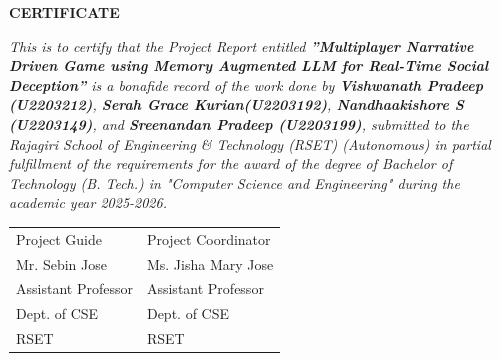 	\newpage
	\thispagestyle{empty}
	\vspace{1cm}
	\begin{center}
	
		\large \bfseries{\huge{CERTIFICATE}}\\[1cm]
	\end{center}
	
	\renewcommand{\baselinestretch}{1.2}\normalsize
	
	\emph{This is to certify that the Project Report entitled \textbf{”Multiplayer Narrative Driven Game using Memory
Augmented LLM for Real-Time Social Deception”} is a bonafide record of the work done by 
\textbf{Vishwanath Pradeep (U2203212)}, 
\textbf{Serah Grace Kurian(U2203192)},
\textbf{Nandhaakishore S (U2203149)},
and 
\textbf{Sreenandan Pradeep (U2203199)},
submitted to the Rajagiri School of Engineering \& Technology (RSET) (Autonomous) in partial fulfillment of the requirements for the award of the degree of Bachelor of Technology (B. Tech.) in "Computer Science and Engineering" during the academic year 2025-2026.}\\[2.5cm]
	
\begin{flushleft}
	
	
	\begin{longtable}{p{10.8cm} p{10.8cm}}
        {Project Guide} &  {Project Coordinator}\\
		{Mr. Sebin Jose} & {Ms. Jisha Mary Jose}\\
		{Assistant Professor} & {Assistant Professor}\\
		{Dept. of CSE} & {Dept. of CSE}\\
		{RSET} & {RSET} \\
		
	\end{longtable}
\end{flushleft}
	

